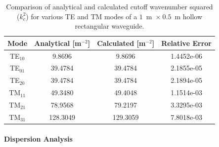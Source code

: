 \begin{table}[b]
 \centering
    \caption{Comparison of analytical and calculated cutoff wavenumber squared ($k_c^2$) for various TE and TM modes of a $1$~m~$\times~0.5$~m hollow rectangular waveguide.}
    \label{lezar:tab:rectangular_cutoff_comparison}
    \begin{tabular}{|c|c|c|c|}
    \hline
    Mode & Analytical [m$^{-2}$] & Calculated [m$^{-2}$] & Relative Error \\
    \hline
    TE$_{10}$ & 9.8696 & 9.8696 & 1.4452e-06\\
    TE$_{01}$ & 39.4784 & 39.4784 & 2.1855e-05\\
    TE$_{20}$ & 39.4784 & 39.4784 & 2.1894e-05\\
    \hline
    TM$_{11}$ & 49.3480 & 49.4048 & 1.1514e-03 \\
    TM$_{21}$ & 78.9568 & 79.2197 & 3.3295e-03\\
    TM$_{31}$ & 128.3049 & 129.3059 & 7.8018e-03\\
    \hline
    \end{tabular}
\end{table}
\clearpage
\paragraph{Dispersion Analysis}

